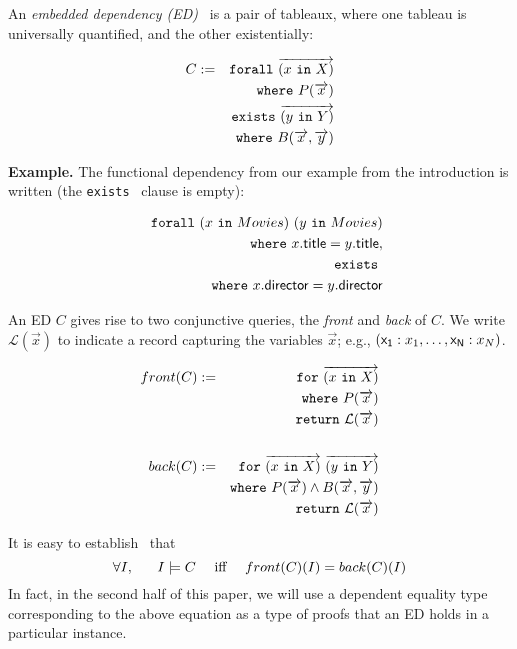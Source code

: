 \documentclass[preprint]{sigplanconf}
\newcommand{\FOR}{{\tt for} \ }
\newcommand{\FORALL}{{\tt forall} \ }
\newcommand{\EXISTS}{{\tt exists} \ }
\newcommand{\WHERE}{{\tt where} \ }
\newcommand{\IN}{ \ {\tt in} \ }
\newcommand{\RETURN}{{\tt return} \ }
\begin{document}
An {\it embedded dependency (ED)}~\cite{foundations} is a pair of tableaux, where one tableau is universally quantified, and the other existentially:
\begin{normalsize}
\begin{eqnarray*}
C & := & \FORALL \overrightarrow{(x \IN X)} \\
 & & \WHERE P(\overrightarrow{x}) \\
 & & \EXISTS \overrightarrow{(y \IN Y)} \\
 & & \WHERE B(\overrightarrow{x}, \overrightarrow{y})
\end{eqnarray*}
\end{normalsize}
{\bf Example.} The functional dependency from our example from the introduction is written (the \EXISTS clause is empty):
\begin{normalsize}
\begin{eqnarray*}
& & \FORALL (x \IN Movies) \ (y \IN Movies) \\
& & \WHERE x.{\sf title} = y.{\sf title}, \\ 
& & \EXISTS \\
& & \WHERE x.{\sf director} = y.{\sf director}
\end{eqnarray*}
\end{normalsize}
An ED $C$ gives rise to two conjunctive queries, the {\it front} and {\it back} of $C$.  We write $\mathcal{L}
(\overrightarrow{x})$ to indicate a record capturing the variables $\overrightarrow{x}
$; e.g., $({\sf x_1}: x_1, \ldots ,{\sf x_N}: x_N)$.  %
\begin{normalsize}
\begin{eqnarray*}
front(C)& := & \FOR \overrightarrow{(x \IN X)} \\ 
& & \WHERE P(\overrightarrow{x}) \\
& & \RETURN \mathcal{L}(\overrightarrow{x})  \\
& & \\
back(C) & := & \FOR \overrightarrow{(x \IN X)} \ \overrightarrow{(y \IN Y)} \\ 
& & \WHERE P(\overrightarrow{x}) \wedge B(\overrightarrow{x}, \overrightarrow{y}) \\
& & \RETURN \mathcal{L}(\overrightarrow{x})
\end{eqnarray*}
\end{normalsize}
It is easy to establish~\cite{Popa99anequational} that 
$$\forall I, \ \ \ \ \ I \models C \ \ \ \ \textnormal{iff} \ \ \ \  front(C)(I) = back(C)(I)$$
In fact, in the second half of this paper, we will use a dependent equality type corresponding to the above equation as a type of proofs that an ED holds in a particular instance.
\end{document}
